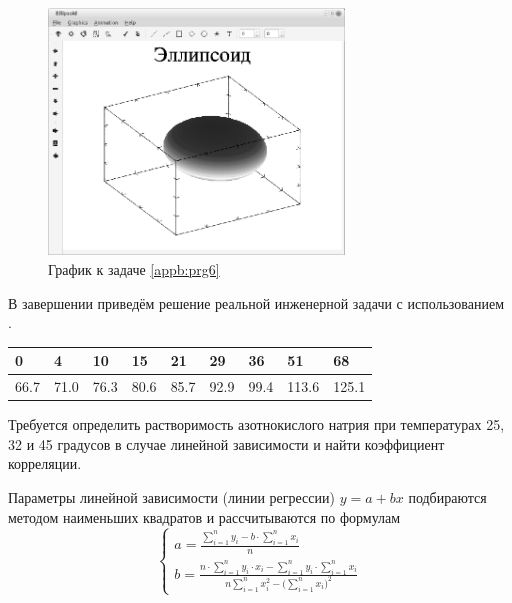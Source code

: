 \begin{figure}[htb]
\begin{center}
\includegraphics[width=0.7\textwidth]{img/ris_appb_8}
\caption{График к задаче \ref{appb:prg6}}
\label{appb:refDrawing7}
\end{center}
\end{figure}

В завершении приведём решение реальной инженерной задачи с использованием .


\begin{center}
\begin{tabular}{|l|l|l|l|l|l|l|l|l|}
\hline
0 &4 &10 &15 &21 &29 &36 &51 &68\\\hline
66.7 &71.0 &76.3 &80.6 &85.7 &92.9 &99.4 &113.6 &125.1\\\hline
\end{tabular}
\end{center}

Требуется определить растворимость азотнокислого натрия при температурах 25, 32 и 45 градусов в случае линейной
зависимости и найти коэффициент корреляции.

Параметры линейной зависимости (линии регрессии) $y=a+bx$ подбираются методом наименьших квадратов и
рассчитываются по формулам  
$$\left\{
\begin{array}{l}
a=\frac{\sum\limits_{i=1}^ny_i-b\cdot\sum\limits_{i=1}^nx_i}{n}\\
b=\frac{n\cdot\sum\limits_{i=1}^ny_i\cdot x_i-\sum\limits_{i=1}^ny_i\cdot\sum\limits_{i=1}^nx_i}
{n\sum\limits_{i=1}^n{x_i^2}-
\bigl(
\sum\limits_{i=1}^nx_i
\bigr)^2}
\end{array}
\right.
$$

